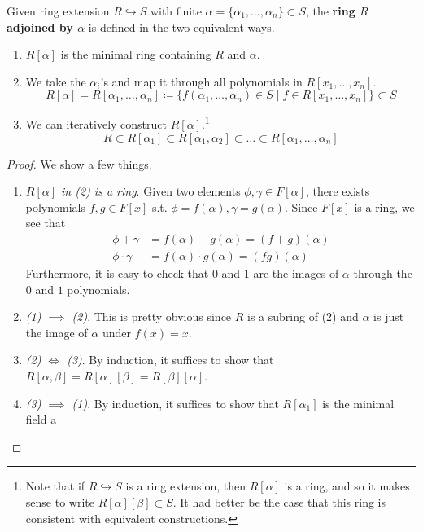   \begin{definition} 
    Given ring extension $R \hookrightarrow S$ with finite $\alpha = \{\alpha_1, \ldots, \alpha_n\} \subset S$, the \textbf{ring $R$ adjoined by $\alpha$} is defined in the two equivalent ways. 
    \begin{enumerate}
      \item $R[\alpha]$ is the minimal ring containing $R$ and $\alpha$. 

      \item We take the $\alpha_i$'s and map it through all polynomials in $R[x_1, \ldots, x_n]$. 
      \begin{equation}
        R[\alpha] = R[\alpha_1, \ldots, \alpha_n] \coloneqq \{ f(\alpha_1, \ldots, \alpha_n) \in S \mid f \in R[x_1, \ldots, x_n]\} \subset S
      \end{equation} 

      \item We can iteratively construct $R[\alpha]$.\footnote{Note that if $R \hookrightarrow S$ is a ring extension, then $R[\alpha]$ is a ring, and so it makes sense to write $R[\alpha][\beta] \subset S$. It had better be the case that this ring is consistent with equivalent constructions.} 
      \begin{equation}
        R \subset R[\alpha_1] \subset R[\alpha_1, \alpha_2] \subset \ldots \subset R[\alpha_1, \ldots, \alpha_n] 
      \end{equation}
    \end{enumerate}
  \end{definition} 
  \begin{proof}
    We show a few things. 
    \begin{enumerate}
      \item \textit{$R[\alpha]$ in (2) is a ring}. Given two elements $\phi, \gamma \in F[\alpha]$, there exists polynomials $f, g \in F[x]$ s.t. $\phi = f(\alpha), \gamma = g(\alpha)$. Since $F[x]$ is a ring, we see that 
      \begin{align}
        \phi + \gamma & = f(\alpha) + g(\alpha) = (f + g)(\alpha) \\
        \phi \cdot \gamma & = f(\alpha) \cdot g(\alpha) = (fg)(\alpha)
      \end{align} 
      Furthermore, it is easy to check that $0$ and $1$ are the images of $\alpha$ through the $0$ and $1$ polynomials. 
      \item \textit{(1) $\implies$ (2)}. This is pretty obvious since $R$ is a subring of (2) and $\alpha$ is just the image of $\alpha$ under $f(x) = x$. 
      \item \textit{(2) $\iff$ (3)}. By induction, it suffices to show that $R[\alpha, \beta] = R[\alpha][\beta] = R[\beta][\alpha]$. 
      \item \textit{(3) $\implies$ (1)}. By induction, it suffices to show that $R[\alpha_1]$ is the minimal field a
    \end{enumerate}
  \end{proof} 

